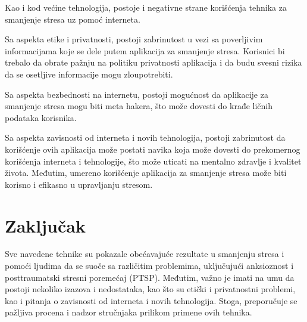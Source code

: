 \documentclass[a4paper]{article}
\begin{document}
Kao i kod većine tehnologija, postoje i negativne strane korišćenja tehnika za smanjenje stresa uz pomoć interneta.

Sa aspekta etike i privatnosti, postoji zabrinutost u vezi sa poverljivim informacijama koje se dele putem aplikacija za smanjenje stresa. Korisnici bi trebalo da obrate pažnju na politiku privatnosti aplikacija i da budu svesni rizika da se osetljive informacije mogu zloupotrebiti.

Sa aspekta bezbednosti na internetu, postoji mogućnost da aplikacije za smanjenje stresa mogu biti meta hakera, što može dovesti do krađe ličnih podataka korisnika.

Sa aspekta zavisnosti od interneta i novih tehnologija, postoji zabrinutost da korišćenje ovih aplikacija može postati navika koja može dovesti do prekomernog korišćenja interneta i tehnologije, što može uticati na mentalno zdravlje i kvalitet života. Međutim, umereno korišćenje aplikacija za smanjenje stresa može biti korisno i efikasno u upravljanju stresom.


\section{Zaključak}
\label{sec:zakljucak}
Sve navedene tehnike su pokazale obećavajuće rezultate u smanjenju stresa i pomoći ljudima da se suoče sa različitim problemima, uključujući anksioznost i posttraumatski stresni poremećaj (PTSP). Međutim, važno je imati na umu da postoji nekoliko izazova i nedostataka, kao što su etički i privatnostni problemi, kao i pitanja o zavisnosti od interneta i novih tehnologija. Stoga, preporučuje se pažljiva procena i nadzor stručnjaka prilikom primene ovih tehnika.
\appendix

\iffalse
 

\fi
\end{document}

